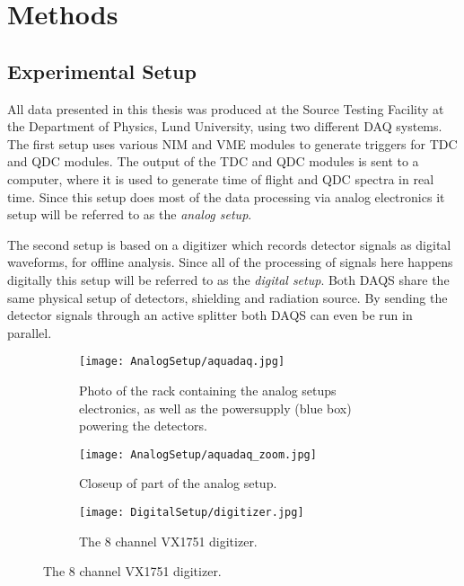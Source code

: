 \documentclass[main.tex]{subfiles}
\begin{document}
\section{Methods}\label{sec:exp_setup}
\subsection{Experimental Setup}
All data presented in this thesis was produced at the Source Testing Facility at the Department of Physics, Lund University, using two different DAQ systems. The first setup uses various NIM and VME modules to generate triggers for TDC and QDC modules. The output of the TDC and QDC modules is sent to a computer, where it is used to generate time of flight and QDC spectra in real time. Since this setup does most of the data processing via analog electronics it setup will be referred to as the \textit{analog setup}. 

The second setup is based on a digitizer which records detector signals as digital waveforms, for offline analysis. Since all of the processing of signals here happens digitally this setup will be referred to as the \textit{digital setup}. 
Both DAQS share the same physical setup of detectors, shielding and radiation source. By sending the detector signals through an active splitter both DAQS can even be run in parallel.


\begin{figure}[ht]
	\begin{subfigure}[b]{0.5\textwidth}
	    \centering
			\captionsetup{width=.80\linewidth}	
    	    \texttt{[image: AnalogSetup/aquadaq.jpg]}
        	\caption{Photo of the rack containing the analog setups electronics, as well as the powersupply (blue box) powering the detectors.}
	    \label{fig:aquadaq_image} 
	\end{subfigure}
	\begin{subfigure}[b]{0.24\textwidth}
	    \centering
	    	\captionsetup{width=1\linewidth}	
    	    \texttt{[image: AnalogSetup/aquadaq\_zoom.jpg]}
        	\caption{Closeup of part of the analog setup.}
	    \label{fig:aquadaq_zoom_image} 
	\end{subfigure}
	\begin{subfigure}[b]{0.24\textwidth}
    	\centering
			\captionsetup{width=.6\linewidth}	
        	\texttt{[image: DigitalSetup/digitizer.jpg]}
        	\caption{The 8 channel VX1751 digitizer.}
    	\label{fig:digitizer_image} 
    \end{subfigure}
\end{figure}
\end{document}
